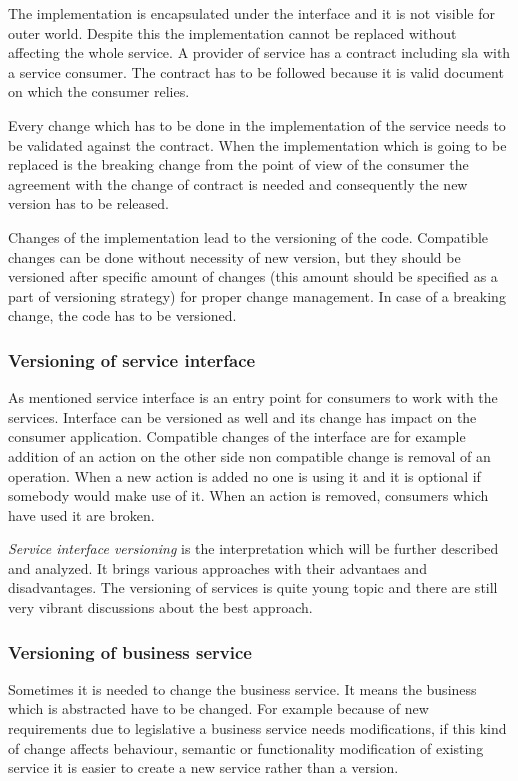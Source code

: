The implementation is encapsulated under the interface and it is not visible for outer world. Despite this the implementation cannot be replaced without affecting the whole service. A provider of service has a contract including \gls{sla} with a service consumer. The contract has to be followed because it is valid document on which the consumer relies. 

Every change which has to be done in the implementation of the service needs to be validated against the contract. When the implementation which is going to be replaced is the breaking change from the point of view of the consumer the agreement with the change of contract is needed and consequently the new version has to be released.

Changes of the implementation lead to the versioning of the code. Compatible changes can be done without necessity of new version, but they should be versioned after specific amount of changes (this amount should be specified as a part of versioning strategy) for proper change management. In case of a breaking change, the code has to be versioned.

\subsubsection{Versioning of service interface}
As mentioned service interface is an entry point for consumers to work with the services. Interface can be versioned as well and its change has impact on the consumer application. Compatible changes of the interface are for example addition of an action on the other side non compatible change is removal of an operation. When a new action is added no one is using it and it is optional if somebody would make use of it. When an action is removed, consumers which have used it are broken.

\emph{Service interface versioning} is the interpretation which will be further described and analyzed. It brings various approaches with their advantaes and disadvantages. The versioning of services is quite young topic and there are still very vibrant discussions about the best approach.

\subsubsection{Versioning of business service}
Sometimes it is needed to change the business service. It means the business which is abstracted have to be changed. For example because of new requirements due to legislative a business service needs modifications, if this kind of change affects behaviour, semantic or functionality modification of existing service it is easier to create a new service rather than a version. 

